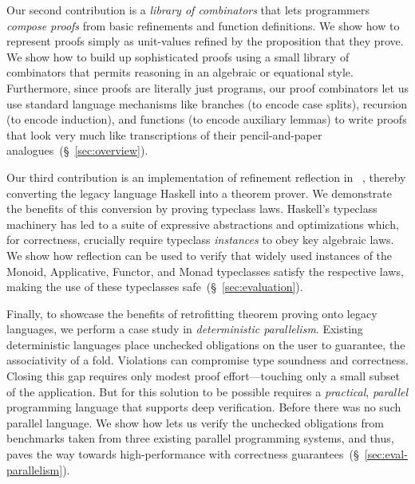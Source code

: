 %
Our second contribution is a
\emph{library of combinators}
that lets programmers
\emph{compose proofs}
from basic refinements
and function definitions.
%
We show how to represent proofs
simply as unit-values refined
by the proposition that
they prove. %
%
We show how to build up sophisticated proofs
using a small library of combinators that
permits reasoning in an algebraic or
equational style.
%
Furthermore, since proofs are literally
just programs, our proof combinators let
us use standard language mechanisms like
branches (to encode case splits),
recursion (to encode induction), and
functions (to encode auxiliary lemmas)
to write proofs that look very much like
transcriptions of their pencil-and-paper
analogues~(\S~\ref{sec:overview}).

%
Our third contribution is an implementation
of refinement reflection in \toolname~\citep{Vazou14},
thereby converting the legacy language
Haskell into a theorem prover.
%
We demonstrate the benefits of this conversion
by proving typeclass laws.
%
Haskell's typeclass machinery has led to
a suite of expressive abstractions and optimizations
which, for correctness, crucially require
typeclass \emph{instances} to obey key algebraic laws.
We show how reflection can be used to verify
that widely used instances of the Monoid, Applicative,
Functor, and Monad typeclasses satisfy the
respective laws, making the use of these typeclasses safe~(\S~\ref{sec:evaluation}).

Finally, to showcase the benefits of retrofitting
theorem proving onto legacy languages, we perform
a case study in \emph{deterministic parallelism}.
%
%
Existing deterministic languages place unchecked
obligations on the user to guarantee, \eg the
associativity of a fold.
%
Violations can compromise type soundness
and correctness.
%
Closing this gap requires only modest proof
effort---touching only a small subset of
the application.
%
But for this solution to be possible requires a
\emph{practical}, \emph{parallel} programming
language that supports deep verification.
%
Before \toolname there was no such parallel language.
%
%
We show how \toolname lets us verify the unchecked obligations
from benchmarks taken from three existing parallel programming
systems, and thus, paves the way towards
high-performance with correctness guarantees~(\S~\ref{sec:eval-parallelism}).


